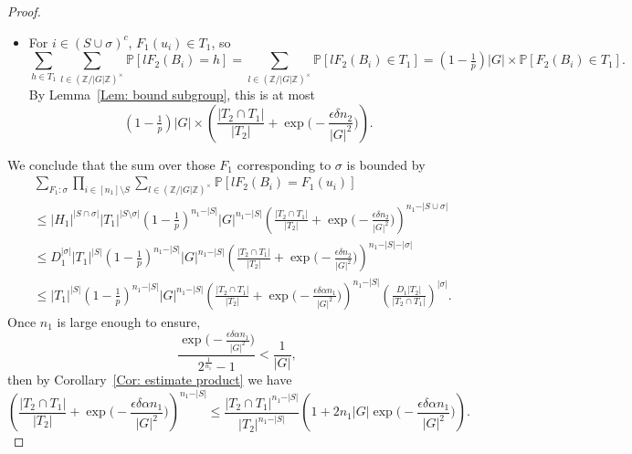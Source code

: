 \documentclass[12pt]{amsart}
\theoremstyle{definition}
\newcommand{\PPP}{\mathbb{P}}
\newcommand{\abs}[1]{\vert#1\vert}
\newcommand{\Z}{\mathbb{Z}}
\begin{document}
\begin{proof}
\begin{itemize}
    \item For $i\in (S\cup \sigma)^c$, $F_1(u_i)\in T_1$, so
\[
\sum_{h\in T_1}
\sum_{l\in (\Z/\abs{G}\Z)^{\times}} \PPP[l F_2(B_i)= h]
=\sum_{l\in (\Z/\abs{G}\Z)^{\times}} \PPP[l F_2(B_i)\in T_1]
=(1-\tfrac{1}{p})\abs{G} 
\times \PPP[ F_2(B_i)\in T_1].
\]
    By Lemma~\ref{Lem: bound subgroup}, this is at most
    \[
    (1-\tfrac{1}{p})\abs{G} 
    \times
    \left(\frac{\abs{T_2\cap T_1}}{\abs{T_2}}+\exp\Big(-\frac{\epsilon\delta n_2}{|G|^2}\Big) \right).
    \]
\end{itemize}
We conclude that the sum over those $F_1$ corresponding to $\sigma$ is bounded by
\begin{align*}
&\sum_{F_1:\sigma}
\prod_{i\in [n_1]\setminus S} \sum_{l\in (\Z/\abs{G}\Z)^{\times}} \PPP[l F_2(B_i)= F_1(u_i)]\\
&\leq \abs{H_1}^{\abs{S\cap \sigma}}
\abs{T_1}^{\abs{S\setminus \sigma}}
(1-\tfrac{1}{p})^{n_1-\abs{S}}\abs{G}^{n_1-\abs{S}} 
\left(\frac{\abs{T_2\cap T_1}}{\abs{T_2}}+\exp\Big(-\frac{\epsilon\delta n_2}{|G|^2}\Big) \right)^{n_1-\abs{S\cup \sigma}}\\
&\leq D_1^{\abs{\sigma}}
\abs{T_1}^{\abs{S}}
(1-\tfrac{1}{p})^{n_1-\abs{S}}\abs{G}^{n_1-\abs{S}} 
\left(\frac{\abs{T_2\cap T_1}}{\abs{T_2}}+\exp\Big(-\frac{\epsilon\delta n_2}{|G|^2}\Big) \right)^{n_1-\abs{S}-\abs{\sigma}}\\
&\leq 
\abs{T_1}^{\abs{S}}
(1-\tfrac{1}{p})^{n_1-\abs{S}}\abs{G}^{n_1-\abs{S}} 
\left(\frac{\abs{T_2\cap T_1}}{\abs{T_2}}+\exp\Big(-\frac{\epsilon\delta \alpha n_1}{|G|^2}\Big) \right)^{n_1-\abs{S}}
\left(\frac{D_1 \abs{T_2}}{\abs{T_2\cap T_1}}\right)^{\abs{\sigma}}.
\end{align*}
Once $n_1$ is large enough to ensure,
\[
\frac{\exp\Big(-\frac{\epsilon\delta \alpha n_1}{|G|^2}\Big)}{2^{\frac{1}{n_1}}-1}
<\frac{1}{\abs{G}},
\]
then by Corollary~\ref{Cor: estimate product} we have
\[
\left(\frac{\abs{T_2\cap T_1}}{\abs{T_2}}+\exp\Big(-\frac{\epsilon\delta \alpha n_1}{|G|^2}\Big) \right)^{n_1-\abs{S}}
\leq \frac{\abs{T_2\cap T_1}^{n_1-\abs{S}}}{\abs{T_2}^{n_1-\abs{S}}}
\left(1+2n_1\abs{G}\exp\Big(-\frac{\epsilon\delta \alpha n_1}{|G|^2}\Big)\right).
\]


\end{proof}
\end{document}
